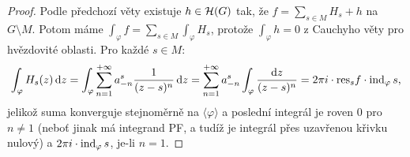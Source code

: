 \begin{proof}
Podle předchozí věty existuje $h \in \operatorname{\mathcal{H}} (G)$ tak, že $f=\sum\limits_{s\in M}H_s+h$ na $G \setminus M$. Potom máme $\int_\varphi f=\sum\limits_{s\in M}\int_\varphi H_s$, protože $\int_\varphi h =0$ z Cauchyho věty pro hvězdovité oblasti. Pro každé $s \in M$:
$$
\int_\varphi H_s(z) \mathop{}\!\mathrm{d} z=\int_\varphi \sum\limits_{n=1}^{+\infty}a_{-n}^s\frac{1}{(z-s)^n} \mathop{}\!\mathrm{d} z = \sum\limits_{n=1}^{+\infty}a_{-n}^s \int_\varphi \frac{\mathop{}\!\mathrm{d} z}{(z-s)^n}=2\pi i \cdot \text{res}_sf\cdot \operatorname{ind}_\varphi s\text{,}
$$
jelikož suma konverguje stejnoměrně na $\langle\varphi \rangle$ a poslední integrál je roven $0$ pro $n \neq 1$ (neboť jinak má integrand PF, a tudíž je integrál přes uzavřenou křivku nulový) a $2 \pi i \cdot \operatorname{ind}_\varphi s$, je-li $n=1$.
\end{proof}
